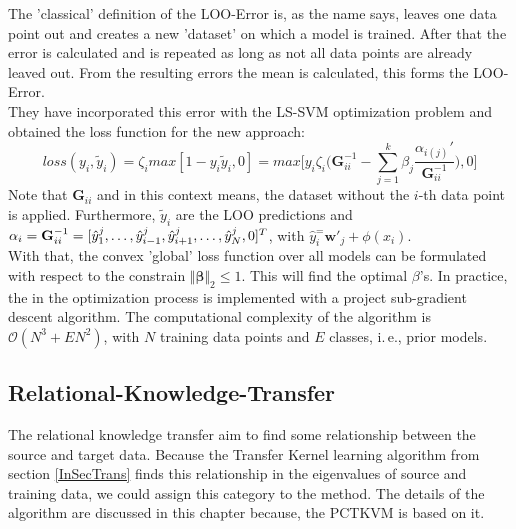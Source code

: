The 'classical' definition of the \acs{LOO}-Error is, as the name says, leaves one data point out and creates a new 'dataset' on which a model is trained.
After that the error is calculated and is repeated as long as not all data points are already leaved out.
From the resulting errors the mean is calculated, this forms the \acl{LOO}-Error.\cite[p.74-76]{Evgeniou.2004}\\
They have incorporated this error with the \acs{LS-SVM} optimization problem and obtained the loss function for the new approach:\cite{Tommasi.}
\begin{equation}
loss(y_i,\tilde{y}_i)= \zeta_i max[1-y_i\tilde{y}_i,0] = max \bigg[y_i\zeta_i\bigg({\mathbf{G}^{-1}_{ii}} - \sum_{j=1}^{k}\beta_j \frac{\alpha_{i(j)}'}{\mathbf{G}^{-1}_{ii}}\bigg),0\bigg]
\end{equation}
Note that $\mathbf{G}_{ii}$ and in this context means, the dataset without the $i$-th data point is applied.
Furthermore, $\tilde{y}_i$ are the \acs{LOO} predictions and $\alpha_i =\mathbf{G}_{ii}^{-1} = [\hat{y}_1^j,\dots,\hat{y}_{i-1}^j,\\\hat{y}_{i+1}^j,\dots,\hat{y}_N^j,0]^T$, with $\hat{y}_i^= \mathbf{w}'_j+\phi(x_i)$.\\
With that, the convex 'global' loss function over all models can be formulated with respect to the constrain $\Vert\boldsymbol{\beta}\Vert_2\le 1$.
This will find the optimal $\beta$'s.
In practice, the in the optimization process is implemented with a project sub-gradient descent algorithm.\cite{Tommasi.}
The computational complexity of the algorithm is $\mathcal{O}(N^3+EN^2)$, with $N$ training data points and $E$ classes, i.\,e., prior models.
\subsection{Relational-Knowledge-Transfer}\label{TlSubSecRelation}
The relational knowledge transfer aim to find some relationship between the source and target data.\cite[p. 7]{Weiss.2016}
Because the Transfer Kernel learning algorithm from section \ref{InSecTrans} finds this relationship in the eigenvalues of source and training data, we could assign this category to the method.
The details of the algorithm are discussed in this chapter because, the \acl{PCTKVM} is based on it.

